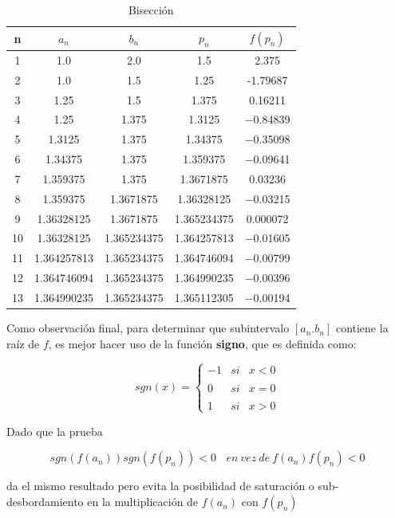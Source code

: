 \begin{table}[h!]
\centering
    \begin{tabular}{||c c c c c||}
    \hline 
    \hline
        n & $a_n$ & $b_n$ & $p_n$ & $f(p_n)$ \\
    \hline 
    \hline 
        1 & 1.0 & 2.0 & 1.5 & 2.375 \\
        2 & 1.0 & 1.5 & 1.25 & -1.79687 \\
        3 & 1.25 & 1.5 & 1.375 & 0.16211 \\
        4 & 1.25 & 1.375 & 1.3125 & −0.84839 \\
        5 & 1.3125 & 1.375 & 1.34375 & −0.35098 \\
        6 & 1.34375 & 1.375 & 1.359375 & −0.09641 \\
        7 & 1.359375 & 1.375 & 1.3671875 & 0.03236 \\
        8 & 1.359375 & 1.3671875 & 1.36328125 & −0.03215 \\
        9 & 1.36328125 & 1.3671875 & 1.365234375 & 0.000072 \\
        10 & 1.36328125 & 1.365234375 & 1.364257813 & −0.01605 \\
        11 & 1.364257813 & 1.365234375 & 1.364746094 & −0.00799 \\
        12 & 1.364746094 & 1.365234375 & 1.364990235 & −0.00396 \\
        13 & 1.364990235 & 1.365234375 & 1.365112305 & −0.00194 \\
        \hline
        \hline 
    \end{tabular}
    \caption{Bisección}
    \label{tab:tabla2}
\end{table}



Como observación final, para determinar que subintervalo $[a_n.b_n]$ contiene la raíz de $f$, es mejor hacer uso de la función \textbf{signo}, que es definida como:

\begin{equation*}
    sgn(x)= \left\{ \begin{array}{lcc}
             -1 &   si  & x < 0 \\
             \\ 0 &  si &  x = 0 \\
             \\ 1 &  si  & x > 0
             \end{array}
   \right.
\end{equation*}

Dado que la prueba

\begin{equation*}
    sgn(f(a_n))sgn(f(p_n))<0 \ \ \ \ en \ vez \ de \  f(a_n)f(p_n)<0
\end{equation*}

da el mismo resultado pero evita la posibilidad de saturación o sub-desbordamiento en la multiplicación de $f(a_n)$ con $f(p_n)$